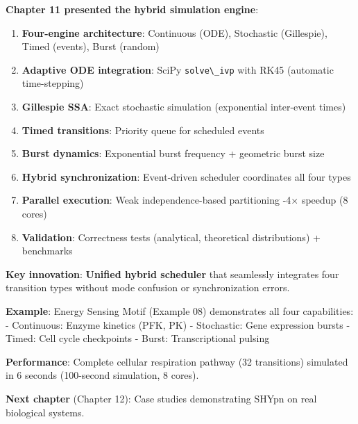 \textbf{Chapter 11 presented the hybrid simulation engine}:

\begin{enumerate}
\def\labelenumi{\arabic{enumi}.}
\tightlist
\item
  \textbf{Four-engine architecture}: Continuous (ODE), Stochastic
  (Gillespie), Timed (events), Burst (random)
\item
  \textbf{Adaptive ODE integration}: SciPy
  \passthrough{\lstinline!solve\_ivp!} with RK45 (automatic
  time-stepping)
\item
  \textbf{Gillespie SSA}: Exact stochastic simulation (exponential
  inter-event times)
\item
  \textbf{Timed transitions}: Priority queue for scheduled events
\item
  \textbf{Burst dynamics}: Exponential burst frequency + geometric burst
  size
\item
  \textbf{Hybrid synchronization}: Event-driven scheduler coordinates
  all four types
\item
  \textbf{Parallel execution}: Weak independence-based partitioning -4× speedup (8 cores)
\item
  \textbf{Validation}: Correctness tests (analytical, theoretical
  distributions) + benchmarks
\end{enumerate}

\textbf{Key innovation}: \textbf{Unified hybrid scheduler} that
seamlessly integrates four transition types without mode confusion or
synchronization errors.

\textbf{Example}: Energy Sensing Motif (Example 08) demonstrates all
four capabilities: - Continuous: Enzyme kinetics (PFK, PK) - Stochastic:
Gene expression bursts - Timed: Cell cycle checkpoints - Burst:
Transcriptional pulsing

\textbf{Performance}: Complete cellular respiration pathway (32
transitions) simulated in 6 seconds (100-second simulation, 8 cores).

\textbf{Next chapter} (Chapter 12): Case studies demonstrating SHYpn on
real biological systems.
